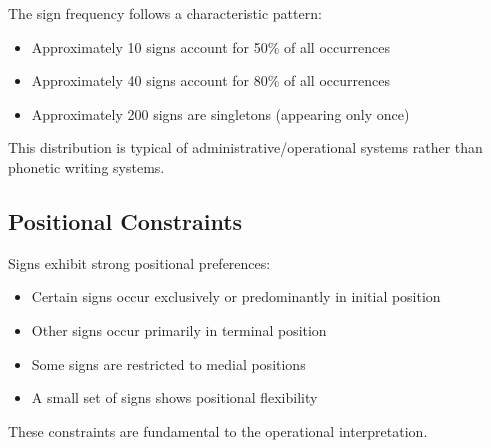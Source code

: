 The sign frequency follows a characteristic pattern:
\begin{itemize}
    \item Approximately 10 signs account for 50\% of all occurrences
    \item Approximately 40 signs account for 80\% of all occurrences
    \item Approximately 200 signs are singletons (appearing only once)
\end{itemize}

This distribution is typical of administrative/operational systems rather than phonetic writing systems.

\subsection{Positional Constraints}

Signs exhibit strong positional preferences:
\begin{itemize}
    \item Certain signs occur exclusively or predominantly in initial position
    \item Other signs occur primarily in terminal position
    \item Some signs are restricted to medial positions
    \item A small set of signs shows positional flexibility
\end{itemize}

These constraints are fundamental to the operational interpretation.
